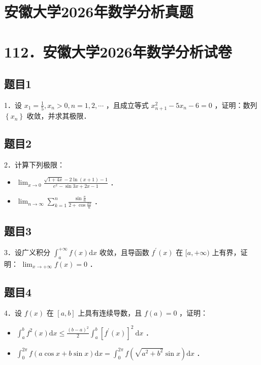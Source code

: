 \documentclass{article}
\begin{document}
\section*{安徽大学2026年数学分析真题}
\section*{112．安徽大学2026年数学分析试卷}

\subsection{题目1}
1．设 \(x_{1}=\frac{1}{5}, x_{n}>0, n=1,2, \cdots\) ，且成立等式 \(x_{n+1}^{2}-5 x_{n}-6=0\) ，证明：数列 \(\left\{x_{n}\right\}\) 收敛，并求其极限．

\subsection{题目2}
2．计算下列极限：

\begin{itemize}
  \item[（1）] \(\lim _{x \rightarrow 0} \frac{\sqrt{1+4 x}-2 \ln (x+1)-1}{e^{x}-\sin 3 x+2 x-1}\) ．
  \item[（2）] \(\lim _{n \rightarrow \infty} \sum_{k=1}^{n} \frac{\sin \frac{\pi}{n}}{2+\cos \frac{k \pi}{n}}\) ．
\end{itemize}

\subsection{题目3}
3．设广义积分 \(\int_{a}^{+\infty} f(x) \mathrm{d} x\) 收敛，且导函数 \(f^{\prime}(x)\) 在 \([a,+\infty)\) 上有界，证明： \(\lim _{x \rightarrow+\infty} f(x)=0\) ．

\subsection{题目4}
4．设 \(f(x)\) 在 \([a, b]\) 上具有连续导数，且 \(f(a)=0\) ，证明：

\begin{itemize}
  \item[（1）] \(\int_{a}^{b} f^{2}(x) \mathrm{d} x \leq \frac{(b-a)^{2}}{2} \int_{a}^{b}\left[f^{\prime}(x)\right]^{2} \mathrm{~d} x\) ．
  \item[（2）] \(\int_{0}^{2 \pi} f(a \cos x+b \sin x) \mathrm{d} x=\int_{0}^{2 \pi} f\left(\sqrt{a^{2}+b^{2}} \sin x\right) \mathrm{d} x\) ．
\end{itemize}
\end{document}

